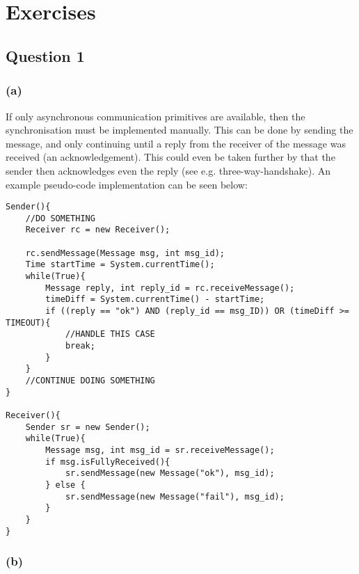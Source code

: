 \documentclass[12pt,a4paper,fleqn]{article}
\begin{document}
\title{\Module\\\Uebung}
\author{\Studentenname}
\maketitle

\section*{Exercises} 
\label{sec:exercises}

\subsection*{Question 1}
\label{sec:eq1}

\subsubsection*{(a)}

If only asynchronous communication primitives are available, then the synchronisation must be implemented manually. This can be done by sending the message, and only continuing until a reply from the receiver of the message was received (an acknowledgement). This could even be taken further by that the sender then acknowledges even the reply (see e.g. three-way-handshake). An example pseudo-code implementation can be seen below:

\begin{lstlisting}[basicstyle=\footnotesize,breaklines=true]
Sender(){
	//DO SOMETHING
	Receiver rc = new Receiver();
	
	rc.sendMessage(Message msg, int msg_id);
	Time startTime = System.currentTime();
	while(True){
		Message reply, int reply_id = rc.receiveMessage();
		timeDiff = System.currentTime() - startTime;
		if ((reply == "ok") AND (reply_id == msg_ID)) OR (timeDiff >= TIMEOUT){
			//HANDLE THIS CASE
			break;
		}
	}
	//CONTINUE DOING SOMETHING
}

Receiver(){
	Sender sr = new Sender();
	while(True){
	 	Message msg, int msg_id = sr.receiveMessage();
	 	if msg.isFullyReceived(){
			sr.sendMessage(new Message("ok"), msg_id);
		} else {
			sr.sendMessage(new Message("fail"), msg_id);
		}
	}
}
\end{lstlisting}


\subsubsection*{(b)}
\end{document}
